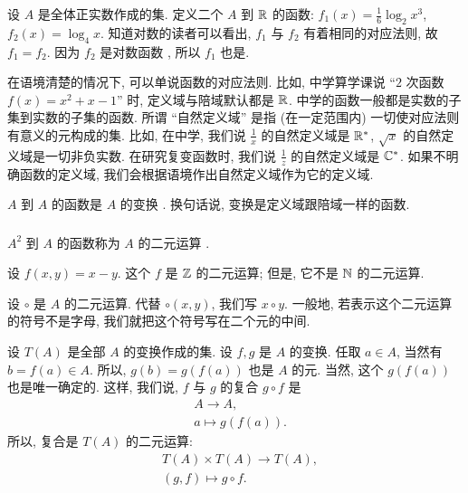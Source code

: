 \begin{example}
    设 $A$ 是全体正实数作成的集. 定义二个 $A$ 到 $\mathbb{R}$ 的函数: $f_1 (x) = \frac16 \log_{2} {x^3}$, $f_2 (x) = \log_{4} {x}$. 知道对数的读者可以看出, $f_1$ 与 $f_2$ 有着相同的对应法则, 故 $f_1 = f_2$. 因为 $f_2$ 是对数函数 , 所以 $f_1$ 也是.
\end{example}

\begin{remark}
    在语境清楚的情况下, 可以单说函数的对应法则. 比如, 中学算学课说 ``$2$ 次函数 $f(x) = x^2 + x - 1$'' 时, 定义域与陪域默认都是 $\mathbb{R}$. 中学的函数一般都是实数的子集到实数的子集的函数. 所谓 ``自然定义域'' 是指 (在一定范围内) 一切使对应法则有意义的元构成的集. 比如, 在中学, 我们说 $\frac{1}{x}$ 的自然定义域是 $\mathbb{R}^{\ast}$, $\sqrt{x}$ 的自然定义域是一切非负实数. 在研究复变函数时, 我们说 $\frac{1}{z}$ 的自然定义域是 $\mathbb{C}^{\ast}$. 如果不明确函数的定义域, 我们会根据语境作出自然定义域作为它的定义域.
\end{remark}

\begin{definition}
    $A$ 到 $A$ 的函数是 $A$ 的变换 . 换句话说, 变换是定义域跟陪域一样的函数.
\end{definition}

\subsubsection*{\BinaryFunctions}

\begin{definition}
    $A^2$ 到 $A$ 的函数称为 $A$ 的二元运算 .
\end{definition}

\begin{example}
    设 $f(x,y) = x-y$. 这个 $f$ 是 $\mathbb{Z}$ 的二元运算; 但是, 它不是 $\mathbb{N}$ 的二元运算.
\end{example}

\begin{remark}
    设 $\circ$ 是 $A$ 的二元运算. 代替 $\circ (x,y)$, 我们写 $x \circ y$. 一般地, 若表示这个二元运算的符号不是字母, 我们就把这个符号写在二个元的中间.
\end{remark}

\begin{definition}
    设 $T(A)$ 是全部 $A$ 的变换作成的集. 设 $f,g$ 是 $A$ 的变换. 任取 $a \in A$, 当然有 $b = f(a) \in A$. 所以, $g(b) = g(f(a))$ 也是 $A$ 的元. 当然, 这个 $g(f(a))$ 也是唯一确定的. 这样, 我们说, $f$ 与 $g$ 的复合  $g \circ f$ 是
    \begin{align*}
         & A \to A, \tag*{$g \circ f \colon$} \\
         & a \mapsto g(f(a)).
    \end{align*}
    所以, 复合是 $T(A)$ 的二元运算:
    \begin{align*}
         & T(A) \times T(A) \to T(A), \tag*{$\circ \colon$} \\
         & (g,f) \mapsto g \circ f.
    \end{align*}
\end{definition}

